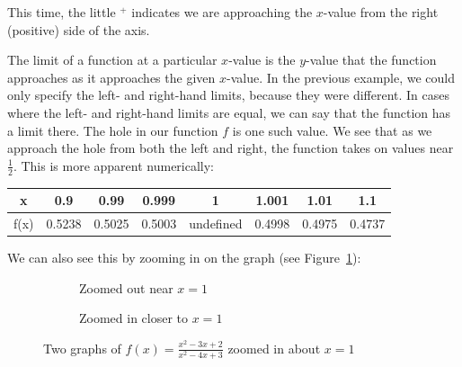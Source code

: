 This time, the little $^+$ indicates we are approaching the $x$-value from the 
right (positive) side of the axis. 

The limit of a function at a particular $ x $-value is the $ y $-value that the 
function approaches as it approaches the given $ x $-value. In the previous 
example, we could only specify the left- and right-hand limits, because they were 
different. In cases where the left- and right-hand limits are equal, we can say 
that the function has a limit there. The hole in our function $ f $ is one such 
value. We see that as we approach the hole from both the left and right, the 
function takes on values near $\frac{1}{2}$. This is more apparent numerically:


\begin{center}
\begin{tabular}{ |c|c|c|c|c|c|c|c| } 
 \hline
 x & 0.9 & 0.99 & 0.999 & 1 & 1.001 & 1.01 & 1.1 \\ 
 \hline
 f(x) & 0.5238 & 0.5025 & 0.5003 & undefined & 0.4998 & 0.4975 & 0.4737 \\ 
 \hline
\end{tabular}
\end{center}

We can also see this by zooming in on the graph (see Figure~\ref{holezoom}):

\begin{figure}[H]
    \centering
    \begin{subfigure}{0.48\textwidth}
        \centering
        \caption{Zoomed out near $x=1$}
    \end{subfigure}
    \hfill
    \begin{subfigure}{0.48\textwidth}
        \centering
        \caption{Zoomed in closer to $x=1$}
    \end{subfigure}
    \caption{Two graphs of $f(x) = \frac{x^2 - 3x + 2}{x^2 - 4x + 3}$ zoomed in about $x = 1$}
    \label{holezoom}
\end{figure}

